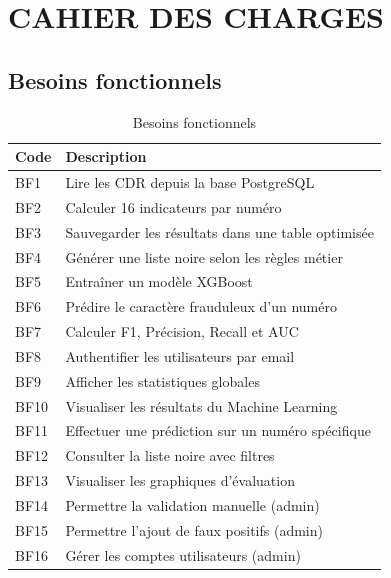 \documentclass[12pt, oneside, a4paper]{report}
\begin{document}
\section{CAHIER DES CHARGES}

\subsection{Besoins fonctionnels}
\begin{table}[h!]
\centering
\caption{Besoins fonctionnels}
\label{tab:bf}
\vspace{0.5cm}
\renewcommand{\arraystretch}{1.3}
\begin{tabular}{|l|p{10cm}|}
\hline
\textbf{Code} & \textbf{Description} \\
\hline
BF1 & Lire les CDR depuis la base PostgreSQL \\
\hline
BF2 & Calculer 16 indicateurs par numéro \\
\hline
BF3 & Sauvegarder les résultats dans une table optimisée \\
\hline
BF4 & Générer une liste noire selon les règles métier \\
\hline
BF5 & Entraîner un modèle XGBoost \\
\hline
BF6 & Prédire le caractère frauduleux d'un numéro \\
\hline
BF7 & Calculer F1, Précision, Recall et AUC \\
\hline
BF8 & Authentifier les utilisateurs par email \\
\hline
BF9 & Afficher les statistiques globales \\
\hline
BF10 & Visualiser les résultats du Machine Learning \\
\hline
BF11 & Effectuer une prédiction sur un numéro spécifique \\
\hline
BF12 & Consulter la liste noire avec filtres \\
\hline
BF13 & Visualiser les graphiques d'évaluation \\
\hline
BF14 & Permettre la validation manuelle (admin) \\
\hline
BF15 & Permettre l'ajout de faux positifs (admin) \\
\hline
BF16 & Gérer les comptes utilisateurs (admin) \\
\hline
\end{tabular}
\end{table}
\end{document}
